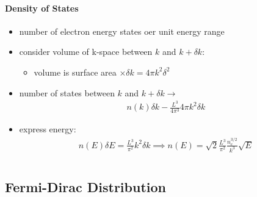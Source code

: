 \documentclass[a4paper,11pt,normalem]{article}
\begin{document}
\paragraph{Density of States}

\begin{itemize}
    \item number of electron energy states oer unit energy range
    \item consider volume of k-space between \(k\) and \(k+\delta k\):
        \begin{itemize}
            \item volume is surface area \(\times \delta k = 4\pi k^2\delta^2\)
        \end{itemize}
    \item number of states between \(k\) and \(k+\delta k \to\)
        \begin{align*}
            n(k)\delta k - \frac{L^3}{4\pi^3}4\pi k^2 \delta k
        \end{align*}
    \item express energy:
        \begin{align*}
            n(E)\delta E = \frac{L^3}{\pi^2}k^2\delta k \implies n(E) = \sqrt{2}\frac{L^3}{\pi^2}\frac{n_e^{3/2}}{k^3}\sqrt{E}
        \end{align*}
\end{itemize}

\section{}
\subsection{Fermi-Dirac Distribution}
\end{document}
